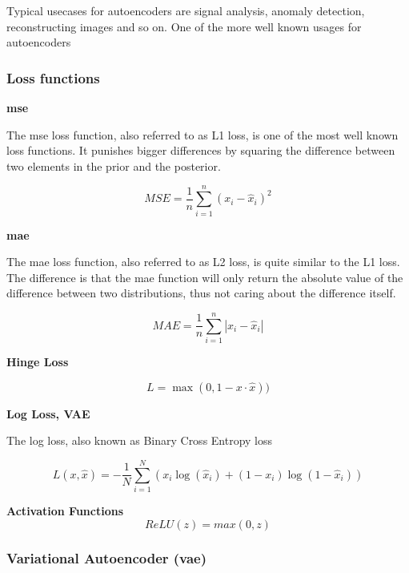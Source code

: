 Typical usecases for autoencoders are signal analysis, anomaly detection, reconstructing images and so on. 
One of the more well known usages for autoencoders

\subsubsection{Loss functions}

\textbf{\acrfull{mse}}

The \acrshort{mse} loss function, also referred to as L1 loss, is one of the most well known loss functions. It punishes bigger differences by squaring the difference between two elements in the prior and the posterior.

\begin{equation}
    MSE = \dfrac{1}{n}  \sum_{i=1}^{n}(x_i-\hat{x}_i)^2
\end{equation}

\textbf{\acrfull{mae}}

The \acrshort{mae} loss function, also referred to as L2 loss, is quite similar to the L1 loss. The difference is that the \acrshort{mae} function will only return the absolute value of the difference between two distributions, thus not caring about the difference itself.

\begin{equation}
    MAE = \dfrac{1}{n}  \sum_{i=1}^{n}|x_i-\hat{x}_i|
\end{equation}

\textbf{Hinge Loss}

\begin{equation}
    L = \max(0, 1 - x \cdot \hat{x}))
\end{equation}

\textbf{Log Loss, VAE}

The log loss, also known as Binary Cross Entropy loss

\begin{equation}
L(x, \hat{x}) = - \frac{1}{N} \sum_{i=1}^{N} \left( x_i \log(\hat{x}_i) + (1 - x_i) \log(1 - \hat{x}_i) \right)
\end{equation}


\textbf{Activation Functions}
\begin{equation}
    ReLU(z) = max(0, z)
\end{equation}

\subsubsection{Variational Autoencoder (\acrshort{vae})}


